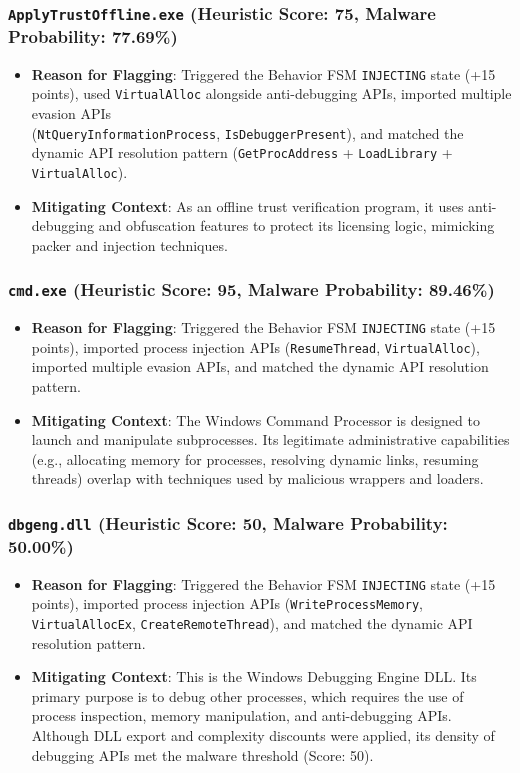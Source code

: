\documentclass[11pt,a4paper]{article}
\begin{document}
\subsubsection{\texttt{ApplyTrustOffline.exe} (Heuristic Score: 75, Malware Probability: 77.69\%)}
\begin{itemize}
    \item \textbf{Reason for Flagging}: Triggered the Behavior FSM \texttt{INJECTING} state (+15 points), used \texttt{VirtualAlloc} alongside anti-debugging APIs, imported multiple evasion APIs \\(\texttt{NtQueryInformationProcess}, \texttt{IsDebuggerPresent}), and matched the dynamic API resolution pattern (\texttt{GetProcAddress} + \texttt{LoadLibrary} + \texttt{VirtualAlloc}).
    \item \textbf{Mitigating Context}: As an offline trust verification program, it uses anti-debugging and obfuscation features to protect its licensing logic, mimicking packer and injection techniques.
\end{itemize}

\subsubsection{\texttt{cmd.exe} (Heuristic Score: 95, Malware Probability: 89.46\%)}
\begin{itemize}
    \item \textbf{Reason for Flagging}: Triggered the Behavior FSM \texttt{INJECTING} state (+15 points), imported process injection APIs (\texttt{ResumeThread}, \texttt{VirtualAlloc}), imported multiple evasion APIs, and matched the dynamic API resolution pattern.
    \item \textbf{Mitigating Context}: The Windows Command Processor is designed to launch and manipulate subprocesses. Its legitimate administrative capabilities (e.g., allocating memory for processes, resolving dynamic links, resuming threads) overlap with techniques used by malicious wrappers and loaders.
\end{itemize}

\subsubsection{\texttt{dbgeng.dll} (Heuristic Score: 50, Malware Probability: 50.00\%)}
\begin{itemize}
    \item \textbf{Reason for Flagging}: Triggered the Behavior FSM \texttt{INJECTING} state (+15 points), imported process injection APIs (\texttt{WriteProcessMemory}, \texttt{VirtualAllocEx}, \texttt{CreateRemoteThread}), and matched the dynamic API resolution pattern.
    \item \textbf{Mitigating Context}: This is the Windows Debugging Engine DLL. Its primary purpose is to debug other processes, which requires the use of process inspection, memory manipulation, and anti-debugging APIs. Although DLL export and complexity discounts were applied, its density of debugging APIs met the malware threshold (Score: 50).
\end{itemize}
\end{document}

